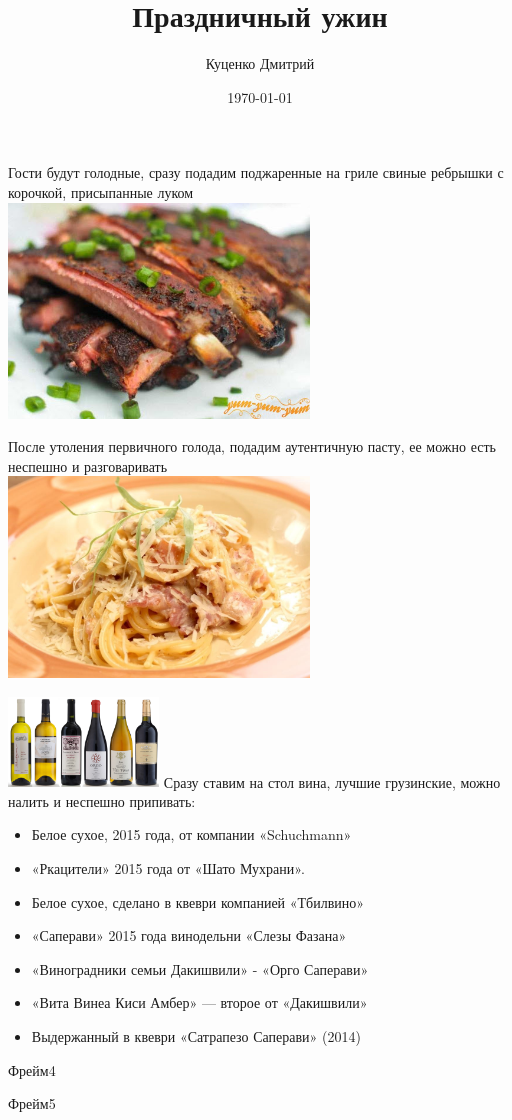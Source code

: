 \documentclass[t]{beamer}
\author{Куценко Дмитрий}
\title{Праздничный ужин}
\date{\today}
\begin{document}
\begin{frame}[plain]
    \titlepage
\end{frame}

\begin{frame}
    Гости будут голодные, сразу подадим поджаренные на гриле свиные ребрышки с корочкой, присыпанные луком \\
    \includegraphics[width=8cm]{6-rebra.jpg}
\end{frame}

\begin{frame}
    После утоления первичного голода, подадим аутентичную пасту, ее можно есть неспешно и разговаривать \\
    \includegraphics[width=8cm]{6-pasta.jpg}
\end{frame}

\begin{frame}
    \includegraphics[width=4cm]{6-wines.jpg}
    Сразу ставим на стол вина, лучшие грузинские, можно налить и неспешно припивать:
    \begin{itemize}
        \item Белое сухое, 2015 года, от компании «Schuchmann»
        \item «Ркацители» 2015 года от «Шато Мухрани». 
        \item Белое сухое, сделано в квеври компанией «Тбилвино»
        \item «Саперави» 2015 года винодельни «Слезы Фазана»
        \item «Виноградники семьи Дакишвили» - «Орго Саперави»
        \item «Вита Винеа Киси Амбер» — второе от «Дакишвили»
        \item Выдержанный в квеври «Сатрапезо Саперави» (2014)
    \end{itemize}
\end{frame}

\begin{frame}
    Фрейм4
\end{frame}

\begin{frame}
    Фрейм5
\end{frame}
\end{document}
